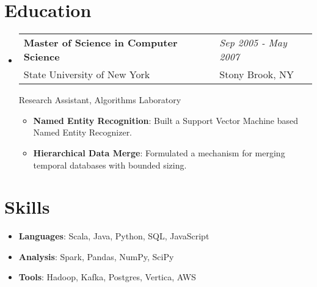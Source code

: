 \documentclass[10pt,twoside,letterpaper]{article}
\newcommand{\resumeItem}[2]{
  \item\small{
    \textbf{#1}{: #2 }
  }
}
\newcommand{\resumeSubHeadingListStart}{\begin{itemize}[leftmargin=*,itemsep=0em]}
\newcommand{\resumeSubHeadingListEnd}{\end{itemize}}
\newcommand{\resumeItemListStart}{
    \begin{minipage}{0.97\textwidth}
        \vspace{0em}\begin{itemize}[itemsep=0pt]
}
\newcommand{\resumeItemListEnd}{
        \end{itemize}
    \end{minipage}
}
\begin{document}
\section{Education}
\resumeSubHeadingListStart
\item {
    \begin{tabularx}{0.97\textwidth}{XR}
      \textbf{Master of Science in Computer Science} & \textit{\small Sep 2005 - May 2007} \\
      State University of New York & Stony Brook, NY  \\
    \end{tabularx}
}
\begin{minipage}{\textwidth}
\vspace{0.25em}
Research Assistant, Algorithms Laboratory
\end{minipage}
    \resumeItemListStart
        \resumeItem{Named Entity Recognition}
          {Built a Support Vector Machine based Named Entity Recognizer.}
          \resumeItem{Hierarchical Data Merge}
          {Formulated a mechanism for merging temporal databases with bounded sizing.}
      \resumeItemListEnd
\resumeSubHeadingListEnd

\section{Skills}
  \resumeSubHeadingListStart
    \item{
      \textbf{Languages}{: Scala, Java, Python, SQL, JavaScript}
         }
    \item {
      \textbf{Analysis}{: Spark, Pandas, NumPy, SciPy}
    }
    \item {
      \textbf{Tools}{: Hadoop, Kafka, Postgres, Vertica, AWS}
    }
  \resumeSubHeadingListEnd

\end{document}
